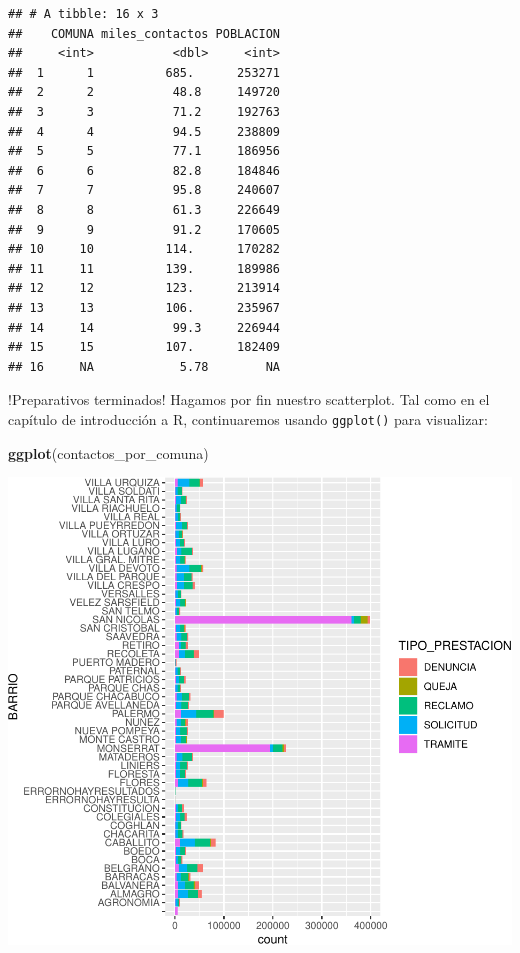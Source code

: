 \documentclass[]{book}
\newenvironment{Shaded}{\begin{snugshade}}{\end{snugshade}}
\newcommand{\KeywordTok}[1]{\textcolor[rgb]{0.13,0.29,0.53}{\textbf{#1}}}
\newcommand{\NormalTok}[1]{#1}
\begin{document}
\begin{verbatim}
## # A tibble: 16 x 3
##    COMUNA miles_contactos POBLACION
##     <int>           <dbl>     <int>
##  1      1          685.      253271
##  2      2           48.8     149720
##  3      3           71.2     192763
##  4      4           94.5     238809
##  5      5           77.1     186956
##  6      6           82.8     184846
##  7      7           95.8     240607
##  8      8           61.3     226649
##  9      9           91.2     170605
## 10     10          114.      170282
## 11     11          139.      189986
## 12     12          123.      213914
## 13     13          106.      235967
## 14     14           99.3     226944
## 15     15          107.      182409
## 16     NA            5.78        NA
\end{verbatim}

!Preparativos terminados! Hagamos por fin nuestro scatterplot. Tal como
en el capítulo de introducción a R, continuaremos usando
\texttt{ggplot()} para visualizar:

\begin{Shaded}
\begin{Highlighting}[]
\KeywordTok{ggplot}\NormalTok{(contactos_por_comuna)}
\end{Highlighting}
\end{Shaded}

\includegraphics{ciencia_de_datos_politicas_publicas_files/figure-latex/unnamed-chunk-78-1.pdf}
\end{document}
